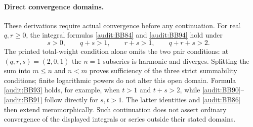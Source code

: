 \paragraph{Direct convergence domains.}
These derivations require actual convergence before any continuation.
For real $q,r\ge0$, the integral formulas
\eqref{audit:BB84} and \eqref{audit:BB94} hold under
\begin{equation}
 s>0,\qquad q+s>1,\qquad r+s>1,\qquad q+r+s>2.
 \label{audit:BB-domain}
\end{equation}
The printed total-weight condition alone omits the two pair conditions:
at $(q,r,s)=(2,0,1)$ the $n=1$ subseries is harmonic and diverges.
Splitting the sum into $m\le n$ and $n<m$ proves sufficiency of the
three strict summability conditions; finite logarithmic powers do not
alter this open domain. Formula \eqref{audit:BB93} holds, for example,
when $t>1$ and $t+s>2$, while \eqref{audit:BB90}--\eqref{audit:BB91}
follow directly for $s,t>1$. The latter identities and
\eqref{audit:BB86} then extend meromorphically. Such continuation does
not assert ordinary convergence of the displayed integrals or series
outside their stated domains.
